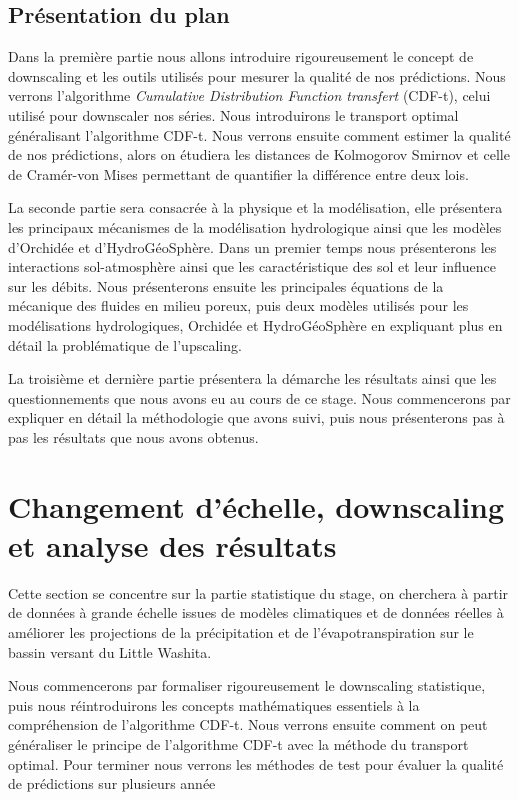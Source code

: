 \documentclass[a4paper,11pt]{article}
\numberwithin{equation}{section}
\begin{document}
\subsection{Présentation du plan}
\label{ch:presentation plan}

Dans la première partie nous allons introduire rigoureusement le concept de downscaling et les outils utilisés pour mesurer la qualité de nos prédictions. Nous verrons l'algorithme \textit{Cumulative Distribution Function transfert} (CDF-t), celui utilisé pour downscaler nos séries. Nous introduirons le transport optimal généralisant l'algorithme CDF-t. Nous verrons ensuite comment estimer la qualité de nos prédictions, alors on étudiera les distances de Kolmogorov Smirnov et celle de Cramér-von Mises permettant de quantifier la différence entre deux lois. 

La seconde partie sera consacrée à la physique et la modélisation, elle présentera les principaux mécanismes de la modélisation hydrologique ainsi que les modèles d'Orchidée et d'HydroGéoSphère. Dans un premier temps nous présenterons les interactions sol-atmosphère ainsi que les caractéristique des sol et leur influence sur les débits. Nous présenterons ensuite les principales équations de la mécanique des fluides en milieu poreux, puis deux modèles utilisés pour les modélisations hydrologiques, Orchidée et HydroGéoSphère en expliquant plus en détail la problématique de l'upscaling.

La troisième et dernière partie présentera la démarche les résultats ainsi que les questionnements que nous avons eu au cours de ce stage. Nous commencerons par expliquer en détail la méthodologie que avons suivi, puis nous présenterons pas à pas les résultats que nous avons obtenus.



\newpage
\section{Changement d'échelle, downscaling et analyse des résultats}
\label{ch:downscaling}
Cette section se concentre sur la partie statistique du stage, on cherchera à partir de données à grande échelle issues de modèles climatiques et de données réelles à améliorer les projections de la précipitation et de l'évapotranspiration sur le bassin versant du Little Washita. 

\vspace{0.7cm}

Nous commencerons par formaliser rigoureusement le downscaling statistique, puis nous réintroduirons les concepts mathématiques essentiels à la compréhension de l'algorithme CDF-t. Nous verrons ensuite comment on peut généraliser le principe de l'algorithme CDF-t avec la méthode du transport optimal. Pour terminer nous verrons les méthodes de test pour évaluer la qualité de prédictions sur plusieurs année
\end{document}
